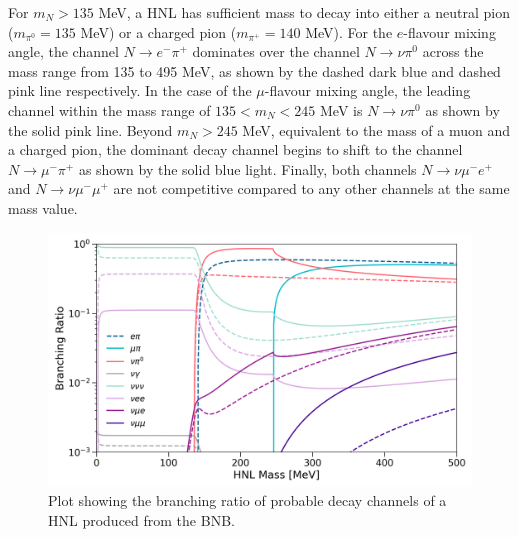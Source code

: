 For $m_{N} > 135$ MeV, a HNL has sufficient mass to decay into either a neutral pion ($m_{\pi^{0}}=135$ MeV) or a charged pion ($m_{\pi^{+}}=140$ MeV). 
For the $e$-flavour mixing angle, the channel $N\rightarrow e^{-}\pi^{+}$ dominates over the channel $N\rightarrow \nu \pi^{0}$ across the mass range from 135 to 495 MeV, as shown by the dashed dark blue and dashed pink line respectively.
In the case of the $\mu$-flavour mixing angle, the leading channel within the mass range of $135 < m_{N} < 245 $ MeV is $N\rightarrow \nu \pi^{0}$ as shown by the solid pink line.
Beyond $m_{N} > 245$ MeV, equivalent to the mass of a muon and a charged pion, the dominant decay channel begins to shift to the channel $N\rightarrow \mu^{-}\pi^{+}$ as shown by the solid blue light. 
Finally, both channels $N\rightarrow \nu \mu^{-}e^{+}$ and $N\rightarrow \nu \mu^{-}\mu^{+}$ are not competitive compared to any other channels at the same mass value.  

\begin{figure}[ht!] 
\centering    
\includegraphics[width=1.0\textwidth]{branching_ratio}
\caption[branchingRatio]
{
Plot showing the branching ratio of probable decay channels of a HNL produced from the BNB.
}
\label{fig:branchingRatio}
\end{figure}



